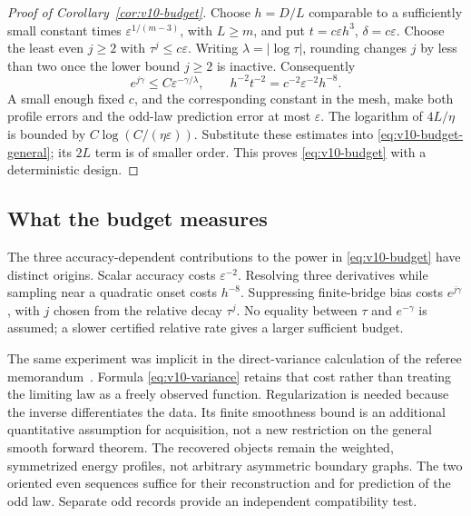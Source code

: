 \begin{proof}[Proof of Corollary~\ref{cor:v10-budget}]
Choose $h=D/L$ comparable to a sufficiently small constant times
$\varepsilon^{1/(m-3)}$, with $L\ge m$, and put
$t=c\varepsilon h^3$, $\delta=c\varepsilon$.
Choose the least even $j\ge2$ with $\tau^j\le c\varepsilon$.
Writing $\lambda=|\log\tau|$, rounding changes $j$ by less than two
once the lower bound $j\ge2$ is inactive. Consequently
\[
 e^{j\gamma}\le C\varepsilon^{-\gamma/\lambda},\qquad
 h^{-2}t^{-2}=c^{-2}\varepsilon^{-2}h^{-8}.
\]
A small enough fixed $c$, and the corresponding constant in the mesh,
make both profile errors and the odd-law prediction error at most
$\varepsilon$. The logarithm of $4L/\eta$ is bounded by
$C\log(C/(\eta\varepsilon))$. Substitute these estimates into
\eqref{eq:v10-budget-general}; its $2L$ term is of smaller order.
This proves \eqref{eq:v10-budget} with a deterministic design.
\end{proof}

\subsection{What the budget measures}
The three accuracy-dependent contributions to the power in
\eqref{eq:v10-budget} have distinct origins. Scalar accuracy costs
$\varepsilon^{-2}$. Resolving three derivatives while sampling
near a quadratic onset costs $h^{-8}$. Suppressing finite-bridge bias
costs $e^{j\gamma}$, with $j$ chosen from the relative decay
$\tau^j$. No equality between $\tau$ and $e^{-\gamma}$ is assumed;
a slower certified relative rate gives a larger sufficient budget.

The same experiment was implicit in the direct-variance calculation
of the referee memorandum~\cite{A2ReviewV9}. Formula
\eqref{eq:v10-variance} retains that cost rather than treating the
limiting law as a freely observed function. Regularization is needed
because the inverse differentiates the data. Its finite smoothness
bound is an additional quantitative assumption for acquisition, not a
new restriction on the general smooth forward theorem. The recovered
objects remain the weighted, symmetrized energy profiles, not arbitrary
asymmetric boundary graphs. The two oriented even sequences suffice
for their reconstruction and for prediction of the odd law. Separate
odd records provide an independent compatibility test.

